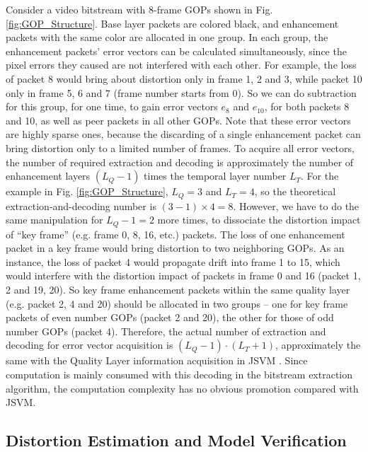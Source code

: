 \documentclass[journal]{IEEEtran}
\begin{document}
Consider a video bitstream with 8-frame GOPs shown in Fig. \ref{fig:GOP_Structure}. Base layer packets are colored black, and enhancement packets with the same color are allocated in one group. In each group, the enhancement packets' error vectors can be calculated simultaneously, since the pixel errors they caused are not interfered with each other. For example, the loss of packet 8 would bring about distortion only in frame 1, 2 and 3, while packet 10 only in frame 5, 6 and 7 (frame number starts from 0). So we can do subtraction for this group, for one time, to gain error vectors $e_{8}$ and $e_{10}$, for both packets 8 and 10, as well as peer packets in all other GOPs. Note that these error vectors are highly sparse ones, because the discarding of a single enhancement packet can bring distortion only to a limited number of frames. To acquire all error vectors, the number of required extraction and decoding is approximately the number of enhancement layers $(L_Q - 1)$ times the temporal layer number $L_T$. For the example in Fig. \ref{fig:GOP_Structure}, $L_Q = 3$ and $L_T = 4$, so the theoretical extraction-and-decoding number is $(3 - 1) \times 4 = 8$. However, we have to do the same manipulation for $L_Q - 1 = 2$ more times, to dissociate the distortion impact of ``key frame'' \cite{H264Overview} (e.g. frame 0, 8, 16, etc.) packets. The loss of one enhancement packet in a key frame would bring distortion to two neighboring GOPs. As an instance, the loss of packet 4 would propagate drift into frame 1 to 15, which would interfere with the distortion impact of packets in frame 0 and 16 (packet 1, 2 and 19, 20). So key frame enhancement packets within the same quality layer (e.g. packet 2, 4 and 20) should be allocated in two groups -- one for key frame packets of even number GOPs (packet 2 and 20), the other for those of odd number GOPs (packet 4). Therefore, the actual number of extraction and decoding for error vector acquisition is $(L_Q - 1) \cdot (L_T + 1)$, approximately the same with the Quality Layer information acquisition in JSVM \cite{Amonou07}. Since computation is mainly consumed with this decoding in the bitstream extraction algorithm, the computation complexity has no obvious promotion compared with JSVM.
 
\subsection{Distortion Estimation and Model Verification}
\label{subsec:distortion-estimation}
\end{document}
